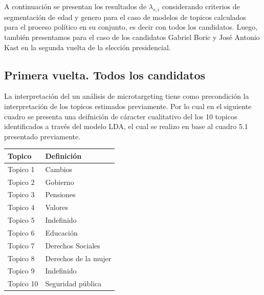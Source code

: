 \documentclass[
  10pt,
  letterpaper,
]{report}
\begin{document}
A continuación se presentan los resultados de \(\lambda_{s,i}\)
considerando criterios de segmentación de edad y genero para el caso de
modelos de topicos calculados para el proceso político en su conjunto,
es decir con todos los candidatos. Luego, también presentamos para el
caso de los candidatos Gabriel Boric y José Antonio Kast en la segunda
vuelta de la elección presidencial.

\hypertarget{primera-vuelta.-todos-los-candidatos}{%
\subsection{Primera vuelta. Todos los
candidatos}\label{primera-vuelta.-todos-los-candidatos}}

La interpretación del un análisis de microtargeting tiene como
precondición la interpretación de los topicos estimados previamente. Por
lo cual en el siguiente cuadro se presenta una deifnición de cáracter
cualitativo del los 10 topicos identificados a través del modelo LDA, el
cual se realizo en base al cuadro 5.1 presentado previamente.

\begin{longtable}[]{@{}ll@{}}
\toprule()
Topico & Definición \\
\midrule()
\endhead
Topico 1 & Cambios \\
Topico 2 & Gobierno \\
Topico 3 & Pensiones \\
Topico 4 & Valores \\
Topico 5 & Indefinido \\
Topico 6 & Educación \\
Topico 7 & Derechos Sociales \\
Topico 8 & Derechos de la mujer \\
Topico 9 & Indefinido \\
Topico 10 & Seguridad pública \\
\bottomrule()
\end{longtable}
\end{document}
